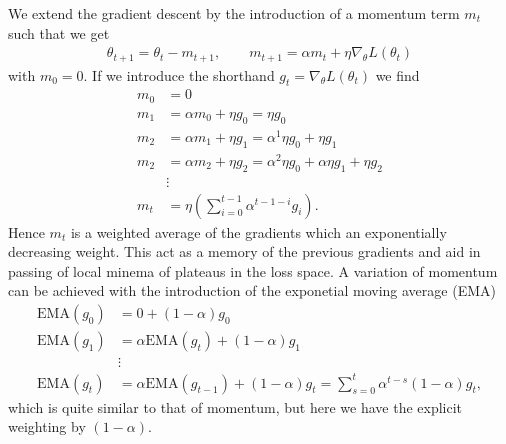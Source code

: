 We extend the gradient descent by the introduction of a momentum term $m_t$ such that we get
\begin{align}
  \theta_{t+1} = \theta_t - m_{t+1}, \qquad m_{t+1} = \alpha m_t + \eta \nabla_\theta L(\theta_t)
  \label{eq:mom}
\end{align}
with $m_0 = 0$. If we introduce the shorthand $g_t = \nabla_\theta L(\theta_t)$ we find
\begin{align*}
  m_0 &= 0 \\
  m_1 &= \alpha m_0 + \eta g_0 = \eta g_0 \\
  m_2 &= \alpha m_1 + \eta g_1 = \alpha^1 \eta g_0 + \eta g_1 \\
  m_2 &= \alpha m_2 + \eta g_2 = \alpha^2 \eta g_0 + \alpha\eta g_1 + \eta g_2 \\
  &\vdots \\
  m_t &= \eta \left(\sum_{i=0}^{t-1} \alpha^{t-1-i}g_i\right).
\end{align*}
Hence $m_t$ is a weighted average of the gradients which an exponentially decreasing weight. This act as a memory of the previous gradients and aid in passing of local minema of plateaus in the loss space. A variation of momentum can be achieved with the introduction of the exponetial moving average (EMA)
\begin{align*}
    \text{EMA}(g_0) &= 0 + (1-\alpha)g_0 \\
    \text{EMA}(g_1) &= \alpha \text{EMA}(g_t) + (1-\alpha)g_1 \\
    &\vdots \\
    \text{EMA}(g_t) &= \alpha \text{EMA}(g_{t-1}) + (1-\alpha)g_t  = \sum_{s=0}^t \alpha^{t-s}(1-\alpha)g_t,
\end{align*}
which is quite similar to that of momentum, but here we have the explicit weighting by $(1-\alpha)$.


